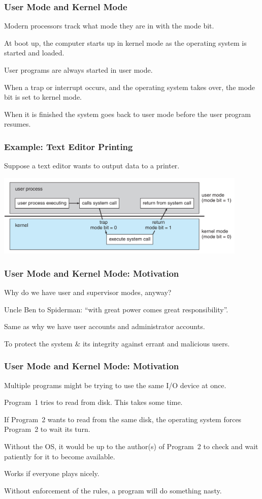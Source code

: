 \begin{frame}
\frametitle{User Mode and Kernel Mode}

Modern processors track what mode they are in with the mode bit. 

At boot up, the computer starts up in kernel mode as the operating system is started and loaded. 

User programs are always started in user mode. 

When a trap or interrupt occurs, and the operating system takes over, the mode bit is set to kernel mode. 

When it is finished the system goes back to user mode before the user program resumes.


\end{frame}


\begin{frame}
\frametitle{Example: Text Editor Printing}

Suppose a text editor wants to output data to a printer.

\begin{center}
	\includegraphics[width=0.9\textwidth]{images/trap.png}
\end{center}

\end{frame}

\begin{frame}
\frametitle{User Mode and Kernel Mode: Motivation}

Why do we have user and supervisor modes, anyway? 

Uncle Ben to Spiderman: ``with great power comes great responsibility''. 

Same as why we have user accounts and administrator accounts. 

To protect the system \& its integrity against errant and malicious users.


\end{frame}

\begin{frame}
\frametitle{User Mode and Kernel Mode: Motivation}

Multiple programs might be trying to use the same I/O device at once.

Program~1 tries to read from disk. This takes some time.

If Program~2 wants to read from the same disk, the operating system forces Program~2 to wait its turn.

Without the OS, it would be up to the author(s) of Program~2 to check and wait patiently for it to become available. 

Works if everyone plays nicely.

Without enforcement of the rules, a program will do something nasty.

\end{frame}

